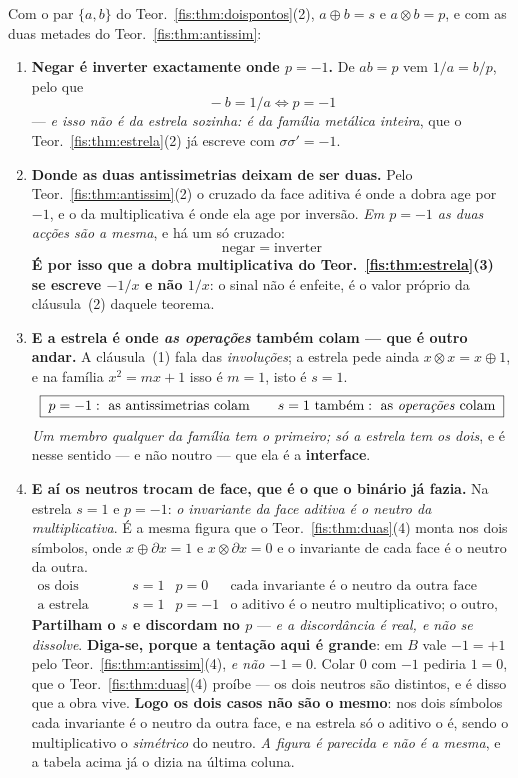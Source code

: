 \documentclass[livro.tex]{subfiles}
\begin{document}
\begin{corolario}\label{fis:cor:estrelaanti}
Com o par $\{a,b\}$ do Teor.~\ref{fis:thm:doispontos}(2), $a\oplus b=s$ e
$a\otimes b=p$, e com as duas metades do Teor.~\ref{fis:thm:antissim}:
\begin{enumerate}\itemsep3pt
\item[(1)] \textbf{Negar é inverter exactamente onde $p=-1$.} De $ab=p$ vem
$1/a=b/p$, pelo que
\[
\boxed{\;-b=1/a\iff p=-1\;}
\]
--- \emph{e isso não é da estrela sozinha: é da família metálica inteira}, que o
Teor.~\ref{fis:thm:estrela}(2) já escreve com $\sigma\sigma'=-1$.
\item[(2)] \textbf{Donde as duas antissimetrias deixam de ser duas.} Pelo
Teor.~\ref{fis:thm:antissim}(2) o cruzado da face aditiva é onde a dobra age por
$-1$, e o da multiplicativa é onde ela age por inversão. \emph{Em $p=-1$ as duas
acções são a mesma}, e há um só cruzado:
\[
\boxed{\;\text{negar}\;=\;\text{inverter}\;}
\]
\textbf{É por isso que a dobra multiplicativa do Teor.~\ref{fis:thm:estrela}(3)
se escreve $-1/x$ e não $1/x$}: o sinal não é enfeite, é o valor próprio da
cláusula~(2) daquele teorema.
\item[(3)] \textbf{E a estrela é onde \emph{as operações} também colam --- que é
outro andar.} A cláusula~(1) fala das \emph{involuções}; a estrela pede ainda
$x\otimes x=x\oplus1$, e na família $x^{2}=mx+1$ isso é $m=1$, isto é $s=1$.
\[
\boxed{\;p=-1:\ \text{as antissimetrias colam}\qquad
s=1\ \text{também}:\ \text{as \emph{operações} colam}\;}
\]
\emph{Um membro qualquer da família tem o primeiro; só a estrela tem os dois}, e
é nesse sentido --- e não noutro --- que ela é a \textbf{interface}.
\item[(4)] \textbf{E aí os neutros trocam de face, que é o que o binário já
fazia.} Na estrela $s=1$ e $p=-1$: \emph{o invariante da face aditiva é o neutro
da multiplicativa}. É a mesma figura que o Teor.~\ref{fis:thm:duas}(4) monta nos
dois símbolos, onde $x\oplus\partial x=1$ e $x\otimes\partial x=0$ e o invariante
de cada face é o neutro da outra.
\[
\begin{array}{lccl}
\text{os dois símbolos} & s=1 & p=0 & \text{cada invariante é o neutro da outra face}\\[2pt]
\text{a estrela} & s=1 & p=-1 & \text{o aditivo é o neutro multiplicativo; o outro, o seu simétrico}
\end{array}
\]
\textbf{Partilham o $s$ e discordam no $p$} --- \emph{e a discordância é real, e
não se dissolve}. \textbf{Diga-se, porque a tentação aqui é grande}: em $B$ vale
$-1=+1$ pelo Teor.~\ref{fis:thm:antissim}(4), \emph{e não $-1=0$}. Colar $0$ com
$-1$ pediria $1=0$, que o Teor.~\ref{fis:thm:duas}(4) proíbe --- os dois neutros
são distintos, e é disso que a obra vive. \textbf{Logo os dois casos não são o
mesmo}: nos dois símbolos cada invariante é o neutro da outra face, e na estrela
só o aditivo o é, sendo o multiplicativo o \emph{simétrico} do neutro. \emph{A
figura é parecida e não é a mesma}, e a tabela acima já o dizia na última coluna.
\end{enumerate}
\end{corolario}
\end{document}
